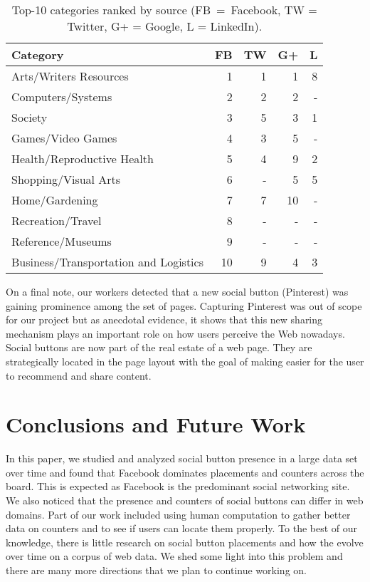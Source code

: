 \documentclass{sig-alternate}
\begin{document}
\begin{table}
\centering
\begin{tabular}{|p{5cm}|r|r|r|r|} \hline
Category & FB & TW & G+ & L \\ \hline

Arts/Writers Resources & 1 & 1 & 1 & 8 \\ \hline
Computers/Systems & 2 & 2 & 2 & - \\ \hline
Society & 3 & 5 & 3 & 1 \\ \hline
Games/Video Games  & 4 & 3 & 5 & - \\ \hline
Health/Reproductive Health & 5 & 4 & 9  & 2\\ \hline
Shopping/Visual Arts & 6 & - & 5 & 5\\ \hline
Home/Gardening & 7 & 7 & 10 & -  \\ \hline
Recreation/Travel & 8 & - & - & -\\ \hline
Reference/Museums & 9 & -  & - & -\\ \hline
Business/Transportation and Logistics & 10 & 9 &4 & 3 \\ \hline
\end{tabular}
\caption{Top-10 categories ranked by source (FB~=~Facebook, TW = Twitter, G+ = Google, L = LinkedIn).}
\label{tbl:odp_source}

\end{table}

On a final note, our workers detected that a new social button (Pinterest) was gaining prominence among the set of pages. Capturing Pinterest was out of scope for our project but as anecdotal evidence, it shows that this new sharing mechanism plays an important role on how users perceive the Web nowadays. 
Social buttons are now part of the real estate of a web page. They are strategically located in the page layout with the goal of making easier for the user to recommend and share content. 

\section{Conclusions and Future Work}
In this paper, we studied and analyzed social button presence in a large data set over time and found that Facebook dominates placements and counters across the board. This is expected as Facebook is the predominant social networking site. We also noticed that the presence and counters of social buttons can differ in web domains. Part of our work included using human computation to gather better data on counters and to see if users can locate them properly. 
To the best of our knowledge, there is little research on social button placements and how the evolve over time on a corpus of web data. We shed some light into this problem and there are many more directions that we plan to continue working on.
\end{document}
